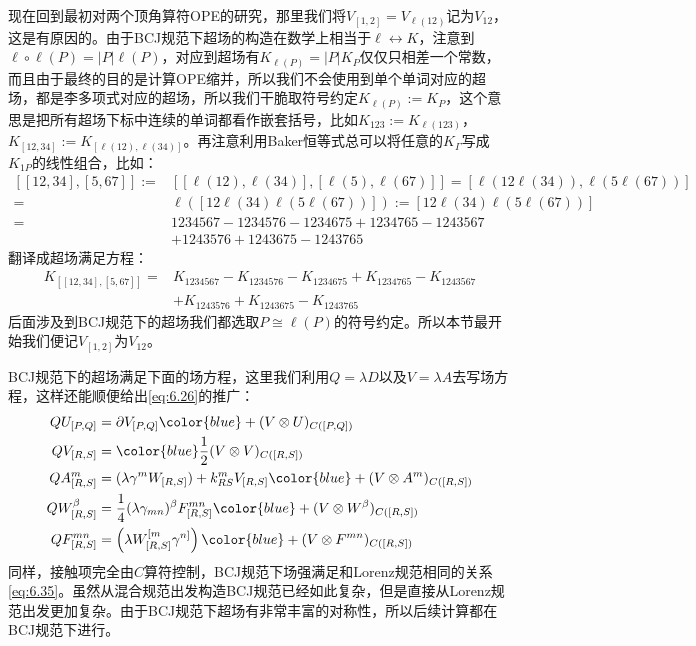 现在回到最初对两个顶角算符OPE的研究，那里我们将$V_{[1,2]}=V_{\ell(12)}$记为$V_{12}$，这是有原因的。由于BCJ规范下超场的构造在数学上相当于$\ell\leftrightarrow K$，注意到$\ell\circ\ell(P) = |P|\ell (P)$，对应到超场有$K_{\ell(P)} = |P|K_P$仅仅只相差一个常数，而且由于最终的目的是计算OPE缩并，所以我们不会使用到单个单词对应的超场，都是李多项式对应的超场，所以我们干脆取符号约定$K_{\ell(P)} := K_P$，这个意思是把所有超场下标中连续的单词都看作嵌套括号，比如$K_{123}:=K_{\ell(123)}$，$K_{[12,34]}:=K_{[\ell(12),\ell(34)]}$。再注意利用Baker恒等式总可以将任意的$K_\Gamma$写成$K_{1P}$的线性组合，比如：
\begin{equation}
	\begin{aligned}
		[[12,34],[5,67]]:=&[[\ell(12),\ell(34)],[\ell(5),\ell(67)]]=[\ell(12\ell(34)),\ell(5\ell(67))]\\
		=&\ell([12\ell(34)\ell(5\ell(67))]):=[12\ell(34)\ell(5\ell(67))]\\
		=&1234567-1234576-1234675+1234765-1243567\\
		&+1243576+1243675-1243765
	\end{aligned}
\end{equation}
翻译成超场满足方程：
\begin{align*}
	K_{[[12,34],[5,67]]}=&K_{1234567}-K_{1234576}-K_{1234675}+K_{1234765}-K_{1243567}\\
	&+K_{1243576}+K_{1243675}-K_{1243765}
\end{align*}
后面涉及到BCJ规范下的超场我们都选取$P\cong\ell(P)$的符号约定。所以本节最开始我们便记$V_{[1,2]}$为$V_{12}$。

BCJ规范下的超场满足下面的场方程，这里我们利用$Q=\lambda D$以及$V=\lambda A$去写场方程，这样还能顺便给出\ref{eq:6.26}的推广：
\begin{equation}
	\begin{aligned}
		QU_{[P,Q]}&=\partial V_{[P,Q]}{\color{blue}+(V\otimes U)_{C([P,Q])}}\\
		QV_{[R,S]}&={\color{blue}\frac{1}{2}(V\otimes V)_{  {C}([R,S])}}
		\\QA_{[R,S]}^m&=(\lambda\gamma^mW_{[R,S]})+k_{RS}^mV_{[R,S]}{\color{blue}+(V\otimes A^m)_{C([R,S])}}
		\\QW_{[R,S]}^{\beta}&=\frac{1}{4}(\lambda\gamma_{mn})^\beta F_{[R,S]}^{mn}{\color{blue}+(V\otimes W^\beta)_{C([R,S])}}
		\\QF_{[R,S]}^{mn}&=\left(\lambda W_{[R,S]}^{[m}\gamma^{n]}\right){\color{blue}+(V\otimes F^{mn})_{  {C}([R,S])}}
	\end{aligned}
\end{equation}
同样，接触项完全由$C$算符控制，BCJ规范下场强满足和Lorenz规范相同的关系\ref{eq:6.35}。虽然从混合规范出发构造BCJ规范已经如此复杂，但是直接从Lorenz规范出发更加复杂\cite{Bridges:2019siz}。由于BCJ规范下超场有非常丰富的对称性，所以后续计算都在BCJ规范下进行。
